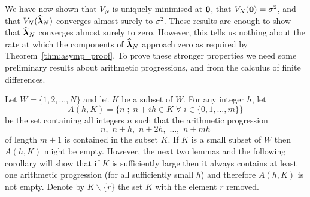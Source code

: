 \documentclass[aap]{imsart}
\newcommand{\prob}{\operatorname{Pr}}
\renewcommand{\mid}{\; ; \;}
\newtheorem{lemma}{Lemma}
\begin{document}

We have now shown that $V_N$ is uniquely minimised at $\boldsymbol{0}$, that $V_N(\boldsymbol{0}) = \sigma^2$, and that $V_N(\widehat{\boldsymbol{\lambda}}_N)$ converges almost surely to $\sigma^2$.  These results are enough to show that $\widehat{\boldsymbol{\lambda}}_N$ converges almost surely to zero.  However, this tells us nothing about the rate at which the components of $\widehat{\boldsymbol{\lambda}}_N$ approach zero as required by Theorem~\ref{thm:asymp_proof}.  To prove these stronger properties we need some preliminary results about arithmetic progressions, and from the calculus of finite differences.
 
Let $W = \{1,2,\dots, N\}$ and let $K$ be a subset of $W$.  For any integer $h$, let
\begin{equation} \label{eq:S(h,G)def} 
A(h,K) = \big\{ n \mid n + ih \in K \;\forall\; i \in \{0,1,\dots,m\} \big\}
\end{equation}
be the set containing all integers $n$ such that the arithmetic progression
\[
n, \,\, n + h, \,\, n + 2h, \,\, \dots, \,\, n + mh
\]
of length $m+1$ is contained in the subset $K$.  If $K$ is a small subset of $W$ then $A(h,K)$ might be empty. However, the next two lemmas and the following corollary will show that if $K$ is sufficiently large then it always contains at least one arithmetic progression (for all sufficiently small $h$) and therefore $A(h,K)$ is not empty. Denote by $K \backslash \{r\}$ the set $K$ with the element $r$ removed.
\end{document}
